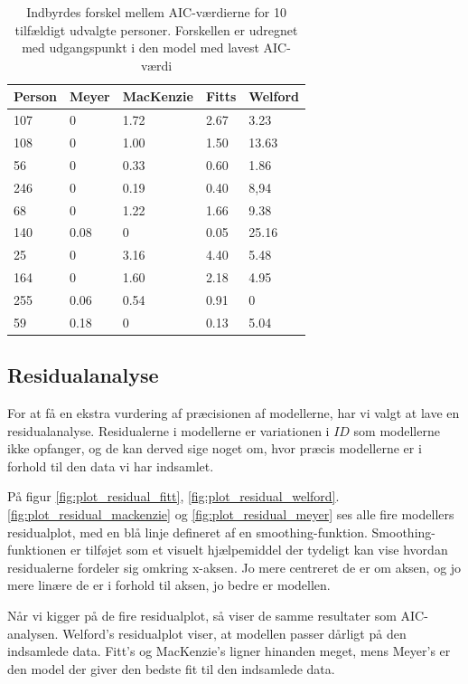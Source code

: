 \begin{table}[h]
\centering
\begin{tabular}{lllll}
Person & Meyer  & MacKenzie & Fitts  & Welford \\\hline
107    & 0      & 1.72      & 2.67   & 3.23    \\
108    & 0      & 1.00      & 1.50   & 13.63   \\
56     & 0      & 0.33      & 0.60   & 1.86    \\
246    & 0      & 0.19      & 0.40   & 8,94    \\
68     & 0      & 1.22      & 1.66   & 9.38    \\
140    & 0.08   & 0         & 0.05   & 25.16   \\
25     & 0      & 3.16      & 4.40   & 5.48    \\
164    & 0      & 1.60      & 2.18   & 4.95    \\
255    & 0.06   & 0.54      & 0.91   & 0       \\
59     & 0.18   & 0         & 0.13   & 5.04
\end{tabular}
\caption{Indbyrdes forskel mellem AIC-værdierne for 10 tilfældigt udvalgte personer. Forskellen er udregnet med udgangspunkt i den model med lavest AIC-værdi}
\label{tab:table_analysis_aic3}
\end{table}

\subsection*{Residualanalyse}
For at få en ekstra vurdering af præcisionen af modellerne, har vi valgt at lave en residualanalyse. Residualerne i modellerne er variationen i $ID$ som modellerne ikke opfanger, og de kan derved sige noget om, hvor præcis modellerne er i forhold til den data vi har indsamlet.

På figur \ref{fig:plot_residual_fitt}, \ref{fig:plot_residual_welford}. \ref{fig:plot_residual_mackenzie} og \ref{fig:plot_residual_meyer} ses alle fire modellers residualplot, med en blå linje defineret af en smoothing-funktion. Smoothing-funktionen er tilføjet som et visuelt hjælpemiddel der tydeligt kan vise hvordan residualerne fordeler sig omkring x-aksen. Jo mere centreret de er om aksen, og jo mere linære de er i forhold til aksen, jo bedre er modellen.

Når vi kigger på de fire residualplot, så viser de samme resultater som AIC-analysen. Welford's residualplot viser, at modellen passer dårligt på den indsamlede data. Fitt's og MacKenzie's ligner hinanden meget, mens Meyer's er den model der giver den bedste fit til den indsamlede data.

